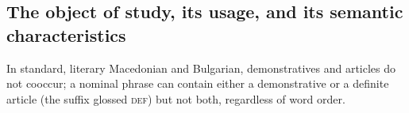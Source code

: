 \documentclass[output=paper,
colorlinks,
citecolor=brown,
newtxmath
]{langscibook}
\begin{document}
\subsection{The object of study, its usage, and its semantic characteristics} \label{stylistic}

In standard, literary Macedonian and Bulgarian, demonstratives and articles do not cooccur; a nominal phrase can contain either a demonstrative or a definite article (the suffix glossed \textsc{def}) but not both, regardless of word order.





\ea\label{Bperson}


\z
\z



\end{document}
